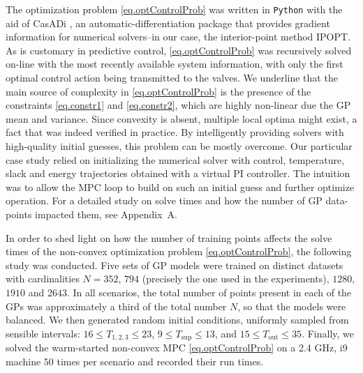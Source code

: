 The optimization problem \eqref{eq.optControlProb} was written in \texttt{Python} with the aid of CasADi \citep{casadi}, an automatic-differentiation package that provides gradient information for numerical solvers--in our case, the interior-point method IPOPT. As is customary in predictive control, \eqref{eq.optControlProb} was recursively solved on-line with the most recently available system information, with only the first optimal control action being transmitted to the valves. We underline that the main source of complexity in \eqref{eq.optControlProb} is the presence of the constraints \eqref{eq.constr1} and \eqref{eq.constr2}, which are highly non-linear due the GP mean and variance. Since convexity is absent, multiple local optima might exist, a fact that was indeed verified in practice. By intelligently providing solvers with high-quality initial guesses, this problem can be mostly overcome. Our particular case study relied on initializing the numerical solver with control, temperature, slack and energy trajectories obtained with a virtual PI controller. The intuition was to allow the MPC loop to build on such an initial guess and further optimize operation. For a detailed study on solve times and how the number of GP data-points impacted them, see Appendix~A.

In order to shed light on how the number of training points affects the solve times of the non-convex optimization problem \eqref{eq.optControlProb}, the following study was conducted. Five sets of GP models were trained on distinct datasets with cardinalities $N = 352$, $794$ (precisely the one used in the experiments), $1280$, $1910$ and $2643$. In all scenarios, the total number of points present in each of the GPs was approximately a third of the total number $N$, so that the models were balanced. We then generated random initial conditions, uniformly sampled from sensible intervals: $16 \leq T_{1,2,3} \leq 23$, $9 \leq T_\text{sup} \leq 13$, and $15 \leq T_\text{out} \leq 35$. Finally, we solved the warm-started non-convex MPC \eqref{eq.optControlProb} on a 2.4 GHz, i9 machine $50$ times per scenario and recorded their run times. 

